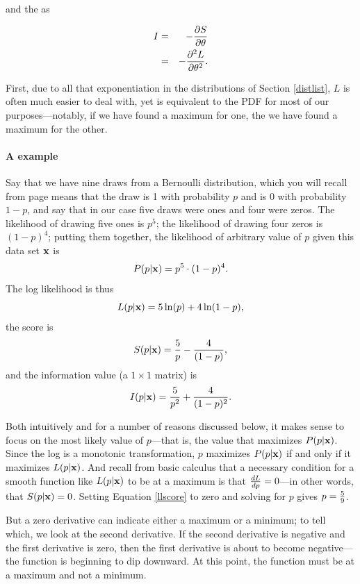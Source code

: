 and the  as

\begin{eqnarray}
I&=&-{\partial S \over \partial \theta}			\nonumber\\
&=&-{\partial^2 L \over \partial \theta^2}.		\nonumber
\end{eqnarray}

First, due to all that exponentiation in the distributions
of Section \ref{distlist}, $L$ is often much easier to deal with, yet
is equivalent to the PDF for most of our purposes---notably, if we have
found a maximum for one, the we have found a maximum for the other.

\paragraph{A  example} Say that we have nine draws from a
Bernoulli distribution, which you will recall from page \pageref{bernie}
means that the draw is 1 with probability $p$ and is 0 with probability
$1-p$, and say that in our case five draws were ones and four were zeros. The likelihood
of drawing five ones is $p^5$; the likelihood of drawing four zeros is
$(1-p)^4$; putting them together, the likelihood of 
arbitrary value of $p$ given this data set ${\bf x}$ is
$$P(p|{\bf x}) = p^5\cdot (1-p)^4.$$
The log likelihood is thus
$$L(p|{\bf x}) = 5 \ln(p)+ 4 \ln(1-p),$$
the score is 
\begin{equation}
S(p|{\bf x}) = {5\over p} - {4\over (1-p)}, \label{llscore}
\end{equation}
and the information value (a $1\times1$ matrix) is
$$I(p|{\bf x}) = {5\over p^2} + {4\over (1-p)^2}.$$

Both intuitively and for a number of reasons discussed below, it makes
sense to focus on the most likely value of $p$---that is, the value that
maximizes $P(p|{\bf x})$. Since the log is a monotonic transformation, $p$
maximizes $P(p|{\bf x})$ if and only if it maximizes $L(p|{\bf x})$. And recall
from basic calculus that a necessary condition for a smooth function
like $L(p|{\bf x})$ to be at a maximum is that ${dL\over dp} = 0$---in other
words, that $S(p|{\bf x}) = 0$. Setting Equation \ref{llscore} to zero and
solving for $p$ gives $p={5\over 9}$. 

But a zero derivative can indicate either a maximum or a minimum; to
tell which, we look at the second derivative. If the second derivative
is negative and the first derivative is zero, then the first derivative
is about to become negative---the function is
beginning to dip downward. At this point, the function must be at a
maximum and not a minimum.

